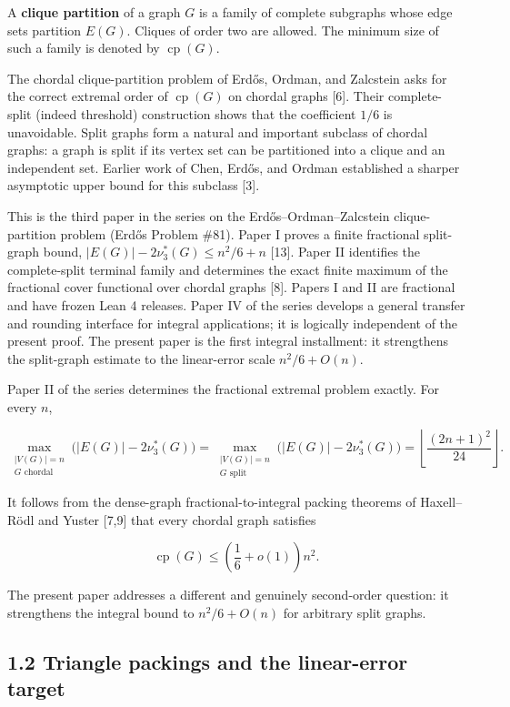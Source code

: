\documentclass[
  11pt,
]{article}
\begin{document}
A \textbf{clique partition} of a graph \(G\) is a family of complete subgraphs whose edge sets partition \(E(G)\). Cliques of order two are allowed. The minimum size of such a family is denoted by \(\operatorname{cp}(G)\).

The chordal clique-partition problem of Erdős, Ordman, and Zalcstein asks for the correct extremal order of \(\operatorname{cp}(G)\) on chordal graphs {[}6{]}. Their complete-split (indeed threshold) construction shows that the coefficient \(1/6\) is unavoidable. Split graphs form a natural and important subclass of chordal graphs: a graph is split if its vertex set can be partitioned into a clique and an independent set. Earlier work of Chen, Erdős, and Ordman established a sharper asymptotic upper bound for this subclass {[}3{]}.

This is the third paper in the series on the Erdős--Ordman--Zalcstein clique-partition problem (Erdős Problem \#81). Paper I proves a finite fractional split-graph bound, \(|E(G)|-2\nu_3^*(G)\le n^2/6+n\) {[}13{]}. Paper II identifies the complete-split terminal family and determines the exact finite maximum of the fractional cover functional over chordal graphs {[}8{]}. Papers I and II are fractional and have frozen Lean 4 releases. Paper IV of the series develops a general transfer and rounding interface for integral applications; it is logically independent of the present proof. The present paper is the first integral installment: it strengthens the split-graph estimate to the linear-error scale \(n^2/6+O(n)\).

Paper II of the series determines the fractional extremal problem exactly. For every \(n\),

\[
\max_{\substack{|V(G)|=n\\G\text{ chordal}}}
\bigl(|E(G)|-2\nu_3^*(G)\bigr)
=
\max_{\substack{|V(G)|=n\\G\text{ split}}}
\bigl(|E(G)|-2\nu_3^*(G)\bigr)
=
\left\lfloor\frac{(2n+1)^2}{24}\right\rfloor.
\]

It follows from the dense-graph fractional-to-integral packing theorems of Haxell--Rödl and Yuster {[}7,9{]} that every chordal graph satisfies

\[
\operatorname{cp}(G)
\le
\left(\frac16+o(1)\right)n^2.
\]

The present paper addresses a different and genuinely second-order question: it strengthens the integral bound to \(n^2/6+O(n)\) for arbitrary split graphs.

\subsection{1.2 Triangle packings and the linear-error target}\label{triangle-packings-and-the-linear-error-target}
\end{document}
